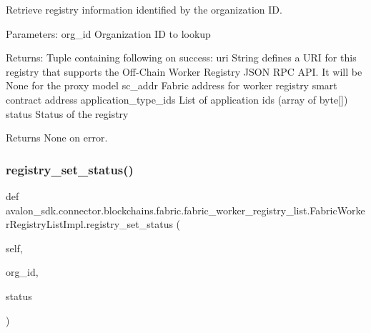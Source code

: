 \begin{DoxyVerb}Retrieve registry information identified by the organization ID.

Parameters:
org_id                Organization ID to lookup

Returns:
Tuple containing following on success:
uri                  String defines a URI for this registry that
             supports the Off-Chain Worker Registry JSON RPC
             API. It will be None for the proxy model
sc_addr              Fabric address for worker registry
             smart contract address
application_type_ids List of application ids (array of byte[])
status               Status of the registry

Returns None on error.
\end{DoxyVerb}
 \mbox{\label{classavalon__sdk_1_1connector_1_1blockchains_1_1fabric_1_1fabric__worker__registry__list_1_1FabricWorkerRegistryListImpl_ae5a9a5c72ce6cfc24bc56eb36492ac72}} 
\subsubsection{\texorpdfstring{registry\+\_\+set\+\_\+status()}{registry\_set\_status()}}
{\footnotesize\ttfamily def avalon\+\_\+sdk.\+connector.\+blockchains.\+fabric.\+fabric\+\_\+worker\+\_\+registry\+\_\+list.\+Fabric\+Worker\+Registry\+List\+Impl.\+registry\+\_\+set\+\_\+status (\begin{DoxyParamCaption}\item[{}]{self,  }\item[{}]{org\+\_\+id,  }\item[{}]{status }\end{DoxyParamCaption})}

